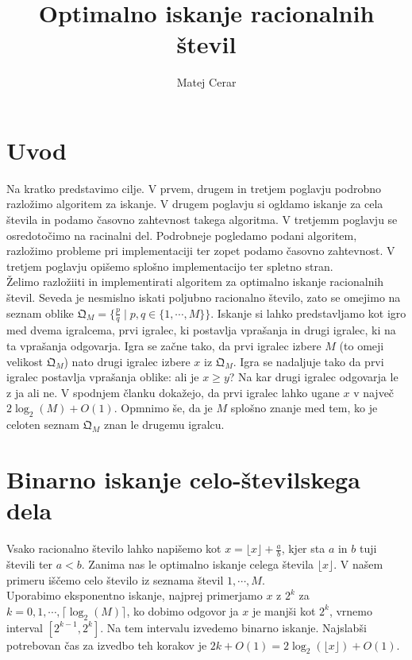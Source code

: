 \documentclass[a4paper,14pt]{article}
\theoremstyle{definition} %
\theoremstyle{plain} %
\begin{document}
\title{Optimalno iskanje racionalnih števil}
\author{Matej Cerar}
\maketitle

\section{Uvod}
Na kratko predstavimo cilje. V prvem, drugem in tretjem poglavju podrobno razložimo algoritem za iskanje.
V drugem poglavju si ogldamo iskanje za cela števila in podamo časovno zahtevnost takega algoritma.
V tretjemm poglavju se osredotočimo na racinalni del. Podrobneje pogledamo podani algoritem, razložimo probleme 
pri implementaciji ter zopet podamo časovno zahtevnost. V tretjem poglavju opišemo splošno implementacijo ter spletno stran.\\

Želimo razložiiti in implementirati algoritem za optimalno iskanje racionalnih števil. 
Seveda je nesmislno iskati poljubno racionalno število, zato se omejimo na seznam oblike 
$\mathfrak{Q} _M = \{\frac{p}{q} \mid p,q \in \{1, \cdots , M\}\}$. Iskanje si lahko predstavljamo kot igro 
med dvema igralcema, prvi igralec, ki postavlja vprašanja in drugi igralec, ki na ta vprašanja odgovarja.
Igra se začne tako, da prvi igralec izbere $M$ (to omeji velikost $\mathfrak{Q}_M$) 
nato drugi igralec izbere $x$ iz $\mathfrak{Q}_M$. Igra se nadaljuje tako da prvi igralec 
postavlja vprašanja oblike: ali je $x\geq y$? Na kar drugi igralec odgovarja le z ja ali ne. 
V spodnjem članku dokažejo, da prvi igralec lahko ugane $x$ v največ $2\log_2(M) + O(1)$.
Opmnimo še, da je $M$ splošno znanje med tem, ko je celoten seznam $\mathfrak{Q}_M$ znan le drugemu igralcu. 

\section{Binarno iskanje celo-številskega dela}

Vsako racionalno število lahko napišemo kot $x = \lfloor x \rfloor + \frac{a}{b}$, 
kjer sta $a$ in $b$ tuji števili ter $a<b$.
Zanima nas le optimalno iskanje celega števila $\lfloor x \rfloor$. V našem primeru iščemo celo število 
iz seznama števil ${1,\cdots,M}$. \\
Uporabimo eksponentno iskanje, najprej primerjamo 
$x$ z $2^k$ za $k= 0,1,\cdots,\lceil \log_2(M)\rceil$, ko dobimo odgovor ja $x$ je 
manjši kot $2^k$, vrnemo interval $[2^{k-1},2^k]$. Na tem intervalu izvedemo binarno iskanje.
Najslabši potrebovan čas za izvedbo teh korakov je $2k+O(1) = 2\log_2(\lfloor x \rfloor)+O(1)$. \newpage
\end{document}
